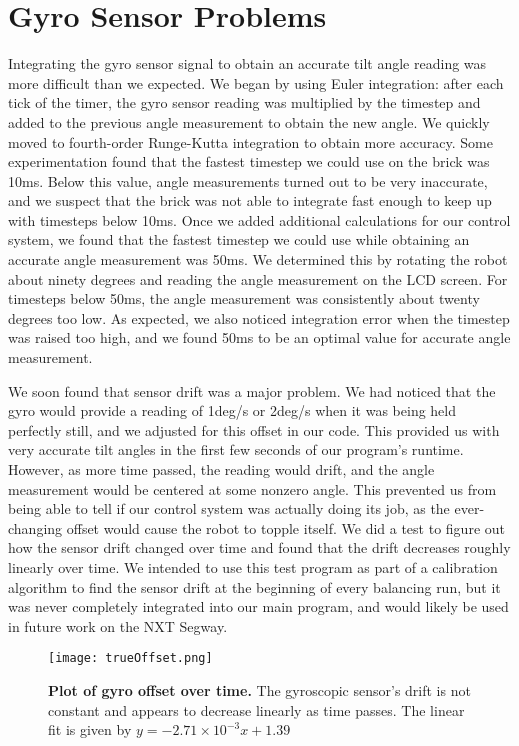 \documentclass[onecolumn, draftclass]{IEEEtran} %
\begin{document}
\section{Gyro Sensor Problems}
Integrating the gyro sensor signal to obtain an accurate tilt angle reading was more difficult than we expected.  We began by using Euler integration: after each tick of the timer, the gyro sensor reading was multiplied by the timestep and added to the previous angle measurement to obtain the new angle.  We quickly moved to fourth-order Runge-Kutta integration to obtain more accuracy.  Some experimentation found that the fastest timestep we could use on the brick was 10ms.  Below this value, angle measurements turned out to be very inaccurate, and we suspect that the brick was not able to integrate fast enough to keep up with timesteps below 10ms.  Once we added additional calculations for our control system, we found that the fastest timestep we could use while obtaining an accurate angle measurement was 50ms.  We determined this by rotating the robot about ninety degrees and reading the angle measurement on the LCD screen. For timesteps below 50ms, the angle measurement was consistently about twenty degrees too low.  As expected, we also noticed integration error when the timestep was raised too high, and we found 50ms to be an optimal value for accurate angle measurement.

We soon found that sensor drift was a major problem.  We had noticed that the gyro would provide a reading of 1deg/s or 2deg/s when it was being held perfectly still, and we adjusted for this offset in our code.  This provided us with very accurate tilt angles in the first few seconds of our program's runtime.  However, as more time passed, the reading would drift, and the angle measurement would be centered at some nonzero angle.  This prevented us from being able to tell if our control system was actually doing its job, as the ever-changing offset would cause the robot to topple itself.  We did a test to figure out how the sensor drift changed over time and found that the drift decreases roughly linearly over time.  We intended to use this test program as part of a calibration algorithm to find the sensor drift at the beginning of every balancing run, but it was never completely integrated into our main program, and would likely be used in future work on the NXT Segway.

\begin{figure} [h]
\centering
\texttt{[image: trueOffset.png]}
\caption{\textbf{Plot of gyro offset over time.} The gyroscopic sensor's drift is not constant and appears to decrease linearly as time passes.  The linear fit is given by $y = -2.71 \times 10^{-3}x + 1.39$} \label{offset}
\end{figure}
\end{document}

